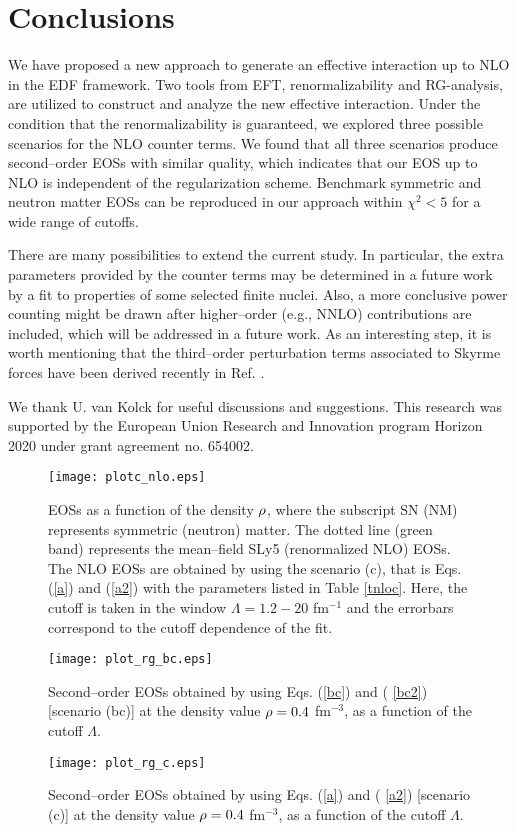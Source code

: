 \documentclass[aps,11pt,prc,preprint,superscriptaddress,nofootinbib]{revtex4}
\begin{document}
\section{Conclusions}

We have proposed a new approach to generate an effective interaction up to NLO in
the EDF framework. Two tools from EFT, renormalizability
and RG-analysis, are utilized to construct and analyze the new effective interaction. Under the condition that the renormalizability is guaranteed, we explored three possible scenarios for the NLO counter terms. We found that all three scenarios produce second--order EOSs with similar quality, which indicates that our EOS up to NLO is independent of the regularization scheme.   
Benchmark symmetric and neutron matter EOSs can be reproduced in our approach within $\chi^2<5$ for a wide range of cutoffs. 

There are many possibilities to extend the current study. 
In particular, the extra parameters provided by the counter terms may be determined in a future work by a fit to properties of some selected finite nuclei. Also, a more conclusive power counting might be drawn after higher--order (e.g., NNLO) contributions are included, which will be addressed in a future work. As an interesting step, it is worth mentioning that the third--order perturbation terms associated to Skyrme forces have been derived recently in Ref. \cite{Kai17}. 

\begin{acknowledgments}
We thank U. van Kolck for useful discussions and suggestions. This research was supported 
by the European Union Research and Innovation program Horizon 2020 
under grant agreement no. 654002. 
\end{acknowledgments}

\begin{figure}[tbp]
\texttt{[image: plotc\_nlo.eps]}
\caption{EOSs as a function of the density $\protect\rho $,
where the subscript SN (NM) represents symmetric (neutron) matter. The
dotted line (green band) represents the mean--field SLy5 (renormalized
NLO) EOSs. The NLO EOSs are obtained
by using the scenario (c), that is Eqs. (\protect\ref{a}) and (\protect\ref{a2}) with the parameters listed in
Table \protect\ref{tnloc}. Here, the cutoff is taken in the window $\Lambda =1.2-20$ fm$^{-1}$ and the errorbars correspond to the 
cutoff dependence of the fit.}
\label{plotnloc}
\end{figure}
\begin{figure}[tbp]
\texttt{[image: plot\_rg\_bc.eps]}
\caption{Second--order EOSs obtained by using Eqs. (\protect\ref{bc}) and (\protect
\ref{bc2}) [scenario (bc)]  at the density value $\protect\rho =0.4$ fm$^{-3}$, as a function of the cutoff $%
\Lambda $. 
}
\label{plot_rg_bc}
\end{figure}
\begin{figure}[tbp]
\texttt{[image: plot\_rg\_c.eps]}
\caption{Second--order EOSs obtained by using Eqs. (\protect\ref{a}) and (\protect
\ref{a2}) [scenario (c)] at the density value $\protect\rho =0.4$ fm$^{-3}$, as a function of the cutoff $%
\Lambda $. 
}
\label{plot_rg_c}
\end{figure}
\end{document}
